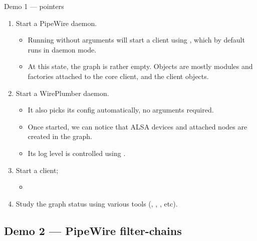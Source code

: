 \begin{frame}[fragile]{Demo 1 — pointers}
  \begin{enumerate}

  \item Start a PipeWire daemon.

    \begin{itemize}
    \item Running  without arguments will start a client
      using , which by default runs in daemon mode.
    \item At this state, the graph is rather empty. Objects are mostly
      modules and factories attached to the core client, and the
      client objects.
    \end{itemize}

  \item Start a WirePlumber daemon.
    \begin{itemize}
    \item It also picks its config automatically, no arguments required.
    \item Once started, we can notice that ALSA devices and attached
      nodes are created in the graph.
    \item Its log level is controlled using .
    \end{itemize}

  \item Start a  client;

    \begin{itemize}
    \item {}
    \end{itemize}

  \item Study the graph status using various tools (,
      , , etc).

  \end{enumerate}
\end{frame}



\subsection{Demo 2 — PipeWire filter-chains}



